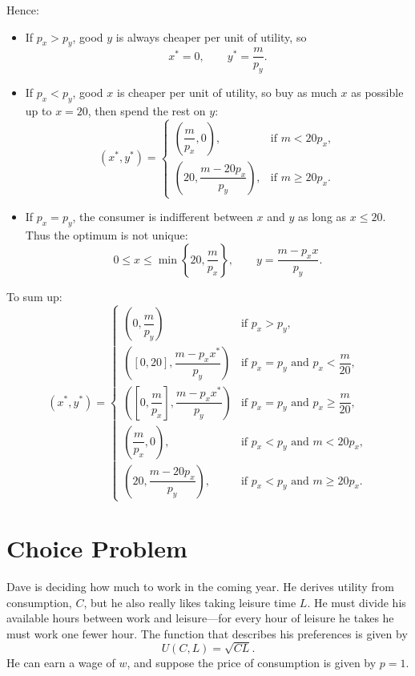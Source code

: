 \documentclass[12pt,a4paper]{article}
\begin{document}
\begin{enumerate}[label=(\arabic*)]
  Hence:
  \begin{itemize}
    \item If \(p_x>p_y\), good \(y\) is always cheaper per unit of utility, so
    \[
      x^*=0,
      \qquad
      y^*=\frac{m}{p_y}.
    \]

    \item If \(p_x<p_y\), good \(x\) is cheaper per unit of utility, so buy as much \(x\) as possible up to \(x=20\), then spend the rest on \(y\):
    \[
      (x^*,y^*)=
      \begin{cases}
        \left(\dfrac{m}{p_x},0\right), & \text{if }m<20p_x,\\[8pt]
        \left(20,\dfrac{m-20p_x}{p_y}\right), & \text{if }m\ge 20p_x.
      \end{cases}
    \]

    \item If \(p_x=p_y\), the consumer is indifferent between \(x\) and \(y\) as long as \(x\le 20\). Thus the optimum is not unique:
    \[
      0\le x\le \min\!\left\{20,\frac{m}{p_x}\right\},
      \qquad
      y=\frac{m-p_xx}{p_y}.
    \]
  \end{itemize}

  To sum up:
  \[
    (x^*,y^*)=
    \begin{cases}
      \left(0,\dfrac{m}{p_y}\right) & \text{if } p_x >p_y, \\[8pt]
      \left(\left[0, 20\right],\dfrac{m-p_xx^*}{p_y}\right) & \text{if } p_x = p_y \text{ and } p_x < \dfrac{m}{20}, \\[8pt]
      \left(\left[0, \dfrac{m}{p_x}\right],\dfrac{m-p_xx^*}{p_y}\right) & \text{if } p_x = p_y \text{ and } p_x \ge \dfrac{m}{20},\\[8pt]
      \left(\dfrac{m}{p_x},0\right), & \text{if } p_x<p_y \text{ and }m<20p_x,\\[8pt]
      \left(20,\dfrac{m-20p_x}{p_y}\right), & \text{if } p_x<p_y \text{ and } m\ge 20p_x.
    \end{cases}
  \]
\end{enumerate}

\section{Choice Problem}

Dave is deciding how much to work in the coming year. He derives utility from consumption, \(C\), but he also really likes taking leisure time \(L\). He must divide his available hours between work and leisure---for every hour of leisure he takes he must work one fewer hour. The function that describes his preferences is given by
\[
    U(C,L)=\sqrt{CL}.
\]
He can earn a wage of \(w\), and suppose the price of consumption is given by \(p=1\).
\end{document}
